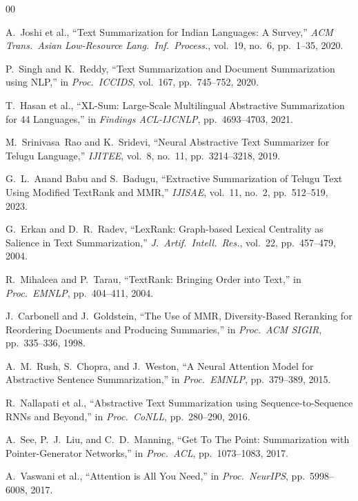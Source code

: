 \documentclass[runningheads]{llncs}
\begin{document}
\begin{thebibliography}{00}

A.~Joshi et al., ``Text Summarization for Indian Languages:
A Survey,'' \textit{ACM Trans.\ Asian Low-Resource Lang.\
Inf.\ Process.}, vol.~19, no.~6, pp.~1--35, 2020.

P.~Singh and K.~Reddy, ``Text Summarization and Document
Summarization using NLP,'' in \textit{Proc.\ ICCIDS},
vol.~167, pp.~745--752, 2020.

T.~Hasan et al., ``XL-Sum: Large-Scale Multilingual
Abstractive Summarization for 44 Languages,''
in \textit{Findings ACL-IJCNLP}, pp.~4693--4703, 2021.

M.~Srinivasa~Rao and K.~Sridevi, ``Neural Abstractive
Text Summarizer for Telugu Language,''
\textit{IJITEE}, vol.~8, no.~11, pp.~3214--3218, 2019.

G.~L.~Anand Babu and S.~Badugu, ``Extractive Summarization
of Telugu Text Using Modified TextRank and MMR,''
\textit{IJISAE}, vol.~11, no.~2, pp.~512--519, 2023.

G.~Erkan and D.~R.~Radev, ``LexRank: Graph-based Lexical
Centrality as Salience in Text Summarization,''
\textit{J.\ Artif.\ Intell.\ Res.}, vol.~22,
pp.~457--479, 2004.

R.~Mihalcea and P.~Tarau, ``TextRank: Bringing Order
into Text,'' in \textit{Proc.\ EMNLP}, pp.~404--411, 2004.

J.~Carbonell and J.~Goldstein, ``The Use of MMR,
Diversity-Based Reranking for Reordering Documents
and Producing Summaries,'' in \textit{Proc.\ ACM SIGIR},
pp.~335--336, 1998.

A.~M.~Rush, S.~Chopra, and J.~Weston, ``A Neural Attention
Model for Abstractive Sentence Summarization,''
in \textit{Proc.\ EMNLP}, pp.~379--389, 2015.

R.~Nallapati et al., ``Abstractive Text Summarization
using Sequence-to-Sequence RNNs and Beyond,''
in \textit{Proc.\ CoNLL}, pp.~280--290, 2016.

A.~See, P.~J.~Liu, and C.~D.~Manning, ``Get To The Point:
Summarization with Pointer-Generator Networks,''
in \textit{Proc.\ ACL}, pp.~1073--1083, 2017.

A.~Vaswani et al., ``Attention is All You Need,''
in \textit{Proc.\ NeurIPS}, pp.~5998--6008, 2017.


\end{thebibliography}
\end{document}
